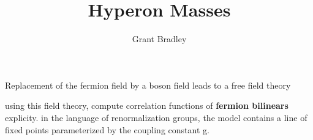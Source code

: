 \documentclass[12pt,tightenlines, raggedbottom, prd, notitlepage]{revtex4-1}
\begin{document}
\title{Hyperon Masses}
\author{Grant Bradley}
\maketitle

Replacement of the fermion field by a boson field leads to a free field theory 

using this field theory, compute correlation functions of \textbf{fermion bilinears} explicity.
in the language of renormalization groups, the model contains a line of fixed points parameterized by 
the coupling constant g. 
\end{document}
